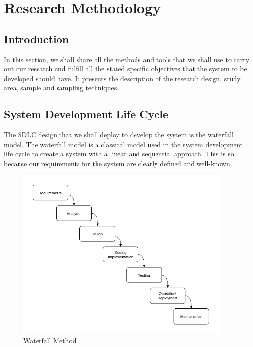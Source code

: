 \documentclass{article}
\begin{document}
\newpage
\section{Research Methodology}
\subsection{Introduction }
In this section, we shall share all the methods and tools that we shall use to carry out our research and fulfill all the stated specific objectives that the system to be developed should have.  It presents the description of the research design, study area, sample and sampling techniques. 

\subsection{System Development Life Cycle}
The SDLC design that we shall deploy to develop the system is the waterfall model. The waterfall model is a classical model used in the system development life cycle to create a system with a linear and sequential approach. This is so because our requirements for the system are clearly defined and well-known.


\vspace{10px}
\begin{figure}[H]
    \centering
    \includegraphics[width=400px]{Images/waterfallv2.png}
    \caption{Waterfall Method}
    \label{waterfall-SDLC-method-image}
\end{figure}
\vspace{10px}
\end{document}
